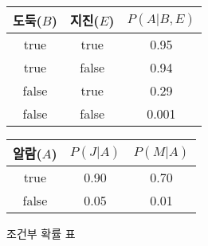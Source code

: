 \documentclass[a4paper]{oblivoir}
\begin{document}
\begin{figure}[ht] \centering 
\parbox[t]{3cm}
{
\begin{tabular}{|c|c|c|}
  \hline
  도둑($B$) & 지진($E$) & $P(A|B,E)$ \\
  \hline
  true & true & 0.95 \\
  \hline
  true & false & 0.94 \\
  \hline
  false & true & 0.29 \\
  \hline
  false & false & 0.001 \\
  \hline
\end{tabular}
} \hspace{3cm}
\parbox[t]{5cm}
{
\begin{tabular}{|c|c|c|}
  \hline
  알람($A$) & $P(J|A)$ & $P(M|A)$ \\
  \hline
  true & 0.90 & 0.70 \\
  \hline
  false & 0.05 & 0.01 \\
  \hline
\end{tabular}
}
\caption{조건부 확률 표}
\label{fig:7-16}
\end{figure} 
\end{document}
